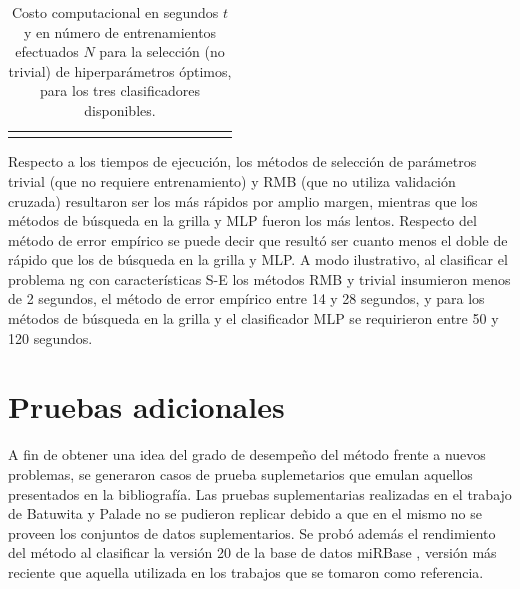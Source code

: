 \documentclass[12pt,bibliography=oldstyle,DIV=12,parskip=half-]{scrreprt}
\begin{document}
\begin{table}[h]
\begin{tabular}{@{}ccc@{}SSSSSSSSSSSSS@{}}

    \bottomrule
    \\
  \end{tabular}
  \caption{\small Costo computacional en segundos $t$ y en número de
    entrenamientos efectuados $N$ para la selección (no trivial) de
    hiperparámetros óptimos, para los tres clasificadores
    disponibles.}
  \label{tbl:compute-cost}
\end{table}
%

Respecto a los tiempos de ejecución, los métodos de selección de
parámetros trivial (que no requiere entrenamiento) y RMB (que no
utiliza validación cruzada) resultaron ser los más rápidos por amplio
margen, mientras que los métodos de búsqueda en la grilla y MLP fueron
los más lentos.  Respecto del método de error empírico se puede decir
que resultó ser cuanto menos el doble de rápido que los de búsqueda en
la grilla y MLP. A modo ilustrativo, al clasificar el problema ng con
características S-E los métodos RMB y trivial insumieron menos de 2
segundos, el método de error empírico entre 14 y 28 segundos, y para
los métodos de búsqueda en la grilla y el
clasificador MLP se requirieron entre 50 y 120 segundos.
%
%
%
\section{Pruebas adicionales}
%
A fin de obtener una idea del grado de desempeño del método frente a
nuevos problemas, se generaron casos de prueba suplemetarios que
emulan aquellos presentados en la bibliografía.
Las pruebas suplementarias realizadas en el trabajo de Batuwita y Palade
\cite{batuwita} no se pudieron replicar debido a que en el mismo
no se proveen los conjuntos de datos suplementarios.
Se probó además el
rendimiento del método al clasificar la versión 20 de la base de datos
miRBase \cite{mirbase3}, versión más reciente que aquella utilizada en
los trabajos que se tomaron como referencia.
\end{document}
